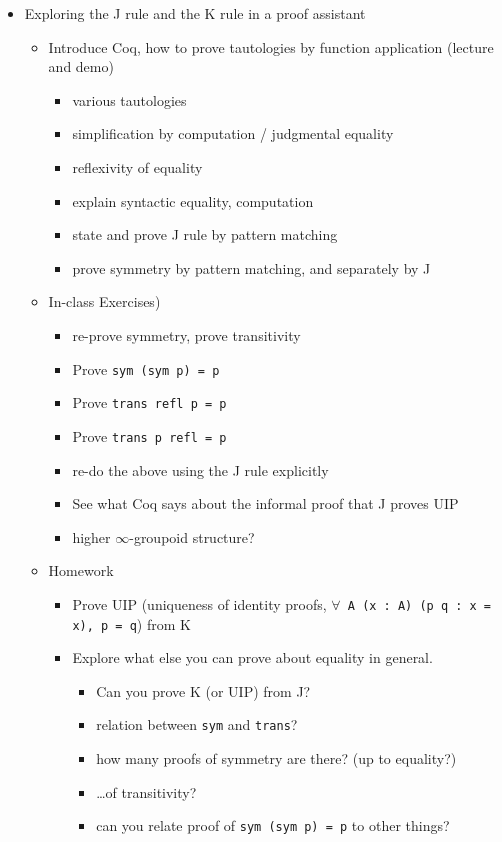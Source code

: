 \documentclass{article}
\begin{document}
\begin{itemize}
  \item Exploring the J rule and the K rule in a proof assistant
    \begin{itemize}
      \item Introduce Coq, how to prove tautologies by function application (lecture and demo)
      \begin{itemize}
        \item various tautologies
        \item simplification by computation / judgmental equality
        \item reflexivity of equality
        \item explain syntactic equality, computation
        \item state and prove J rule by pattern matching
        \item prove symmetry by pattern matching, and separately by J
      \end{itemize}
      \item In-class Exercises)
      \begin{itemize}
        \item re-prove symmetry, prove transitivity
        \item Prove \texttt{sym (sym p) = p}
        \item Prove \texttt{trans refl p = p}
        \item Prove \texttt{trans p refl = p}
        \item re-do the above using the J rule explicitly
        \item See what Coq says about the informal proof that J proves UIP
        \item higher $\infty$-groupoid structure?
      \end{itemize}
      \item Homework
      \begin{itemize}
        \item Prove UIP (uniqueness of identity proofs, \texttt{$\forall$ A (x~:~A) (p q~:~x = x), p = q}) from K
        \item Explore what else you can prove about equality in general.
        \begin{itemize}
          \item Can you prove K (or UIP) from J?
          \item relation between \texttt{sym} and \texttt{trans}?
          \item how many proofs of symmetry are there? (up to equality?)
          \item \ldots\space of transitivity?
          \item can you relate proof of \texttt{sym (sym p) = p} to other things?
        \end{itemize}
      \end{itemize}
    \end{itemize}
\end{itemize}
\end{document}
